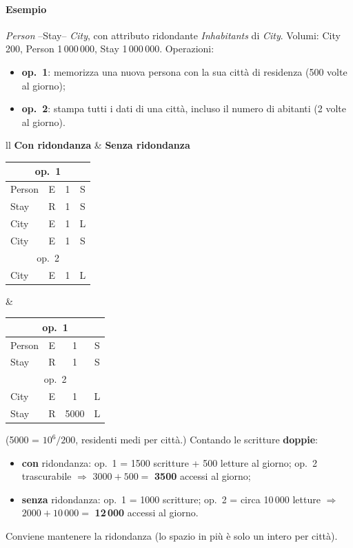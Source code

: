 \documentclass[a4paper,12pt]{article}
\begin{document}
\paragraph{Esempio} \emph{Person} --Stay-- \emph{City}, con attributo
ridondante \emph{Inhabitants} di \emph{City}. Volumi: City 200, Person
1\,000\,000, Stay 1\,000\,000. Operazioni:
\begin{itemize}
  \item \textbf{op.\ 1}: memorizza una nuova persona con la sua città di
    residenza (500 volte al giorno);
  \item \textbf{op.\ 2}: stampa tutti i dati di una città, incluso il numero
    di abitanti (2 volte al giorno).
\end{itemize}

\begin{center}
\begin{tabular}{ll}
\textbf{Con ridondanza} & \textbf{Senza ridondanza}\\[2pt]
\begin{tabular}[t]{|l|c|c|c|}
\hline
\multicolumn{4}{|c|}{op.\ 1}\\ \hline
Person & E & 1 & S\\ Stay & R & 1 & S\\ City & E & 1 & L\\ City & E & 1 & S\\ \hline
\multicolumn{4}{|c|}{op.\ 2}\\ \hline
City & E & 1 & L\\ \hline
\end{tabular}
&
\begin{tabular}[t]{|l|c|c|c|}
\hline
\multicolumn{4}{|c|}{op.\ 1}\\ \hline
Person & E & 1 & S\\ Stay & R & 1 & S\\ \hline
\multicolumn{4}{|c|}{op.\ 2}\\ \hline
City & E & 1 & L\\ Stay & R & 5000 & L\\ \hline
\end{tabular}
\end{tabular}
\end{center}
(5000 = $10^6/200$, residenti medi per città.) Contando le scritture
\textbf{doppie}:
\begin{itemize}
  \item \textbf{con} ridondanza: op.\ 1 = 1500 scritture + 500 letture al
    giorno; op.\ 2 trascurabile $\Rightarrow$ $3000 + 500 = $ \textbf{3500}
    accessi al giorno;
  \item \textbf{senza} ridondanza: op.\ 1 = 1000 scritture; op.\ 2 = circa
    10\,000 letture $\Rightarrow$ $2000 + 10\,000 = $ \textbf{12\,000}
    accessi al giorno.
\end{itemize}
Conviene mantenere la ridondanza (lo spazio in più è solo un intero per
città).
\end{document}
